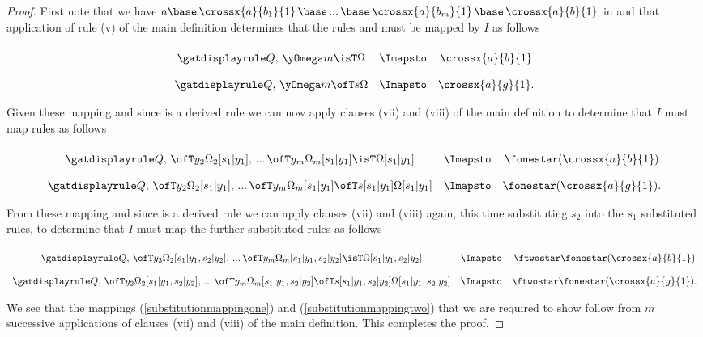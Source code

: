 \begin{proof}
First note that we have $a \base\, \crossx{a}{b_1}{1}\, \base\, ...\, \base\, \crossx{a}{b_m}{1}\, \base\, \crossx{a}{b}{1}$ in \catcw
and  that application of rule (v) of the main definition determines that the rules \weakenedOmegarule and \weakenedsrule must be mapped by $I$ as follows
\begin{equation*}
\begin{array}{c c c}
\forceSOURCEwidth & & \forceTARGETwidth \\ [-0.1cm]
\weakenedOmegarule  & \Imapsto & \crossx{a}{b}{1}   \\ [0.4cm]
\weakenedsrule      & \Imapsto & \crossx{a}{g}{1}.
\end{array}
\end{equation*}

Given these mapping and since  \sonerule is a derived rule we can now apply clauses (vii) and (viii) of the main definition
to determine that $I$ must map rules as follows
\begin{equation*}
\begin{array}{c c c}
\forceSOURCEwidth & & \forceTARGETwidth \\ [-0.1cm]
\weakenedOmegaruleFirstsubstitution  & \Imapsto & \fonestar(\crossx{a}{b}{1})   \\ [0.4cm]
\weakenedsruleFirstsubstitution      & \Imapsto & \fonestar(\crossx{a}{g}{1}).
\end{array}
\end{equation*}

From these mapping and since  \stworule is a derived rule we can  apply clauses (vii) and (viii) again,
this time substituting $s_2$ into the $s_1$ substituted rules, to determine that $I$ must map the further substituted rules as follows
\begin{equation*}
\begin{array}{c c c}
\forceSOURCEwidth & & \forceTARGETwidth \\ [-0.1cm]
\weakenedOmegaruleSecondsubstitution  & \Imapsto & \ftwostar \fonestar(\crossx{a}{b}{1})   \\ [0.4cm]
\weakenedsruleSecondsubstitution      & \Imapsto & \ftwostar \fonestar(\crossx{a}{g}{1}).
\end{array}
\end{equation*}
                                                                  
We see that the mappings (\ref{substitutionmappingone}) and (\ref{substitutionmappingtwo}) that we are required to show follow from $m$ successive applications of clauses (vii) and (viii) of the main definition.
This completes the proof.
\end{proof}

